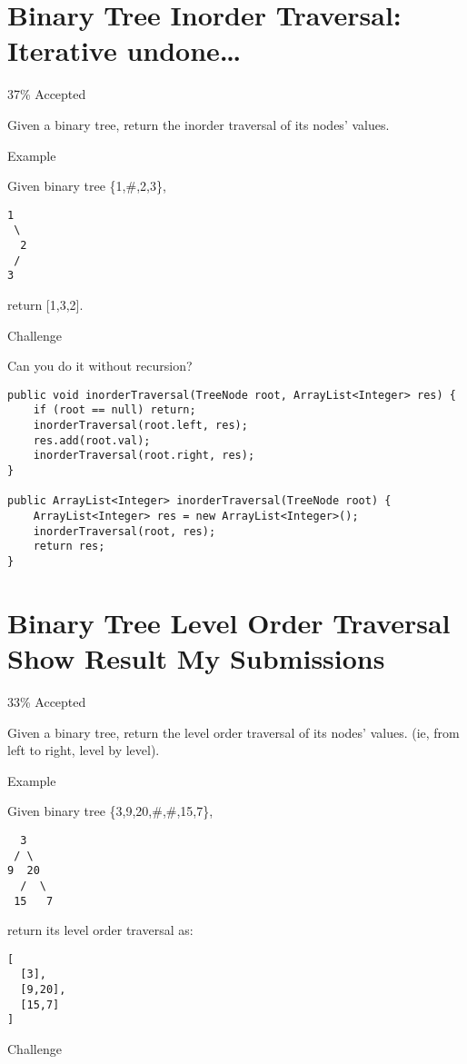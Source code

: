 \documentclass[12pt]{book}
\begin{document}
\chapter{Binary Tree Inorder Traversal: Iterative undone\ldots{}}
\label{sec-14}

37\% Accepted

Given a binary tree, return the inorder traversal of its nodes' values.

Example

Given binary tree \{1,\#,2,3\},
\lstset{language=java,label= ,caption= ,numbers=none}
\begin{lstlisting}
1
 \
  2
 /
3
\end{lstlisting}

return [1,3,2].

Challenge

Can you do it without recursion?
\lstset{language=java,label= ,caption= ,numbers=none}
\begin{lstlisting}
public void inorderTraversal(TreeNode root, ArrayList<Integer> res) {
    if (root == null) return;
    inorderTraversal(root.left, res);
    res.add(root.val);
    inorderTraversal(root.right, res);
}

public ArrayList<Integer> inorderTraversal(TreeNode root) {
    ArrayList<Integer> res = new ArrayList<Integer>();
    inorderTraversal(root, res);
    return res;
}
\end{lstlisting}
\chapter{Binary Tree Level Order Traversal Show Result My Submissions}
\label{sec-15}

33\% Accepted

Given a binary tree, return the level order traversal of its nodes' values. (ie, from left to right, level by level).

Example

Given binary tree \{3,9,20,\#,\#,15,7\},
\lstset{language=java,label= ,caption= ,numbers=none}
\begin{lstlisting}
  3
 / \
9  20
  /  \
 15   7
\end{lstlisting}

return its level order traversal as:
\lstset{language=java,label= ,caption= ,numbers=none}
\begin{lstlisting}
[
  [3],
  [9,20],
  [15,7]
]
\end{lstlisting}

Challenge
\end{document}
